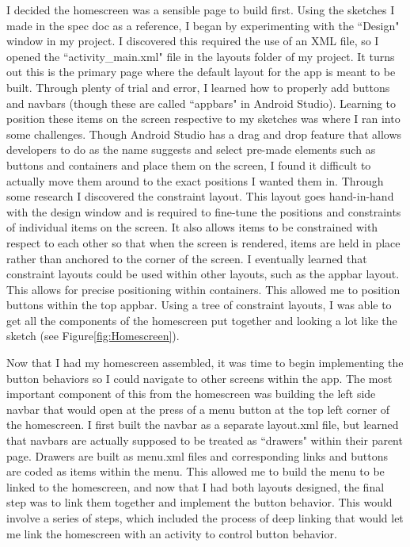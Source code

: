 \documentclass{article}
\begin{document}
I decided the homescreen was a sensible page to build first. Using the sketches I made in the spec doc as a reference, I began by experimenting with the ``Design" window in my project. I discovered this required the use of an XML file, so I opened the ``activity\_main.xml" file in the layouts folder of my project. It turns out this is the primary page where the default layout for the app is meant to be built\cite{DeepLinking}. Through plenty of trial and error, I learned how to properly add buttons and navbars (though these are called ``appbars" in Android Studio). Learning to position these items on the screen respective to my sketches was where I ran into some challenges. Though Android Studio has a drag and drop feature that allows developers to do as the name suggests and select pre-made elements such as buttons and containers and place them on the screen, I found it difficult to actually move them around to the exact positions I wanted them in. Through some research I discovered the constraint layout\cite{ConstraintLayout}. This layout goes hand-in-hand with the design window and is required to fine-tune the positions and constraints of individual items on the screen. It also allows items to be constrained with respect to each other so that when the screen is rendered, items are held in place rather than anchored to the corner of the screen. I eventually learned that constraint layouts could be used within other layouts, such as the appbar layout. This allows for precise positioning within containers. This allowed me to position buttons within the top appbar. Using a tree of constraint layouts, I was able to get all the components of the homescreen put together and looking a lot like the sketch (see Figure\ref{fig:Homescreen}).

Now that I had my homescreen assembled, it was time to begin implementing the button behaviors so I could navigate to other screens within the app. The most important component of this from the homescreen was building the left side navbar that would open at the press of a menu button at the top left corner of the homescreen. I first built the navbar as a separate layout.xml file, but learned that navbars are actually supposed to be treated as ``drawers" within their parent page\cite{DrawerLayout}. Drawers are built as menu.xml files and corresponding links and buttons are coded as items within the menu. This allowed me to build the menu to be linked to the homescreen, and now that I had both layouts designed, the final step was to link them together and implement the button behavior. This would involve a series of steps, which included the process of deep linking\cite{DeepLinking} that would let me link the homescreen with an activity to control button behavior\cite{Activities}. 
\end{document}
